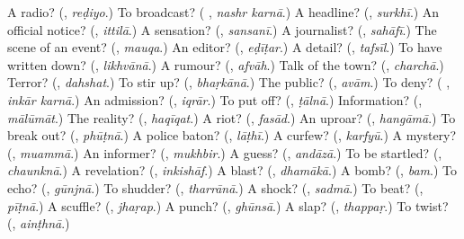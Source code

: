 \begin{tcolorbox}[breakable,colback=teal!4,colframe=teal!35!black,title={Before you move on}]
A radio? (\textbf{}, \emph{reḍiyo}.) To broadcast? (\textbf{ }, \emph{nashr karnā}.) A headline? (\textbf{}, \emph{surkhī}.) An official notice? (\textbf{}, \emph{ittilā}.) A sensation? (\textbf{}, \emph{sansanī}.) A journalist? (\textbf{}, \emph{sahāfī}.) The scene of an event? (\textbf{}, \emph{mauqa}.) An editor? (\textbf{}, \emph{eḍīṭar}.) A detail? (\textbf{}, \emph{tafsīl}.) To have written down? (\textbf{}, \emph{likhvānā}.) A rumour? (\textbf{}, \emph{afvāh}.) Talk of the town? (\textbf{}, \emph{charchā}.) Terror? (\textbf{}, \emph{dahshat}.) To stir up? (\textbf{}, \emph{bhaṛkānā}.) The public? (\textbf{}, \emph{avām}.) To deny? (\textbf{ }, \emph{inkār karnā}.) An admission? (\textbf{}, \emph{iqrār}.) To put off? (\textbf{}, \emph{ṭālnā}.) Information? (\textbf{}, \emph{mālūmāt}.) The reality? (\textbf{}, \emph{haqīqat}.) A riot? (\textbf{}, \emph{fasād}.) An uproar? (\textbf{}, \emph{hangāmā}.) To break out? (\textbf{}, \emph{phūṭnā}.) A police baton? (\textbf{}, \emph{lāṭhī}.) A curfew? (\textbf{}, \emph{karfyū}.) A mystery? (\textbf{}, \emph{muammā}.) An informer? (\textbf{}, \emph{mukhbir}.) A guess? (\textbf{}, \emph{andāzā}.) To be startled? (\textbf{}, \emph{chaunknā}.) A revelation? (\textbf{}, \emph{inkishāf}.) A blast? (\textbf{}, \emph{dhamākā}.) A bomb? (\textbf{}, \emph{bam}.) To echo? (\textbf{}, \emph{gūnjnā}.) To shudder? (\textbf{}, \emph{tharrānā}.) A shock? (\textbf{}, \emph{sadmā}.) To beat? (\textbf{}, \emph{pīṭnā}.) A scuffle? (\textbf{}, \emph{jhaṛap}.) A punch? (\textbf{}, \emph{ghūnsā}.) A slap? (\textbf{}, \emph{thappaṛ}.) To twist? (\textbf{}, \emph{ainṭhnā}.)
\end{tcolorbox}
